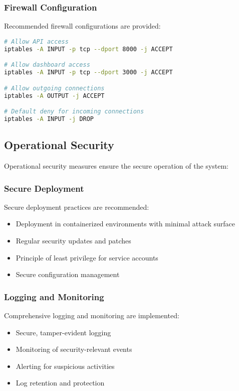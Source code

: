 \subsubsection{Firewall Configuration}
Recommended firewall configurations are provided:

\begin{lstlisting}[language=bash, caption=Firewall Configuration Example]
# Allow API access
iptables -A INPUT -p tcp --dport 8000 -j ACCEPT

# Allow dashboard access
iptables -A INPUT -p tcp --dport 3000 -j ACCEPT

# Allow outgoing connections
iptables -A OUTPUT -j ACCEPT

# Default deny for incoming connections
iptables -A INPUT -j DROP
\end{lstlisting}

\subsection{Operational Security}
Operational security measures ensure the secure operation of the system:

\subsubsection{Secure Deployment}
Secure deployment practices are recommended:

\begin{itemize}
    \item Deployment in containerized environments with minimal attack surface
    \item Regular security updates and patches
    \item Principle of least privilege for service accounts
    \item Secure configuration management
\end{itemize}

\subsubsection{Logging and Monitoring}
Comprehensive logging and monitoring are implemented:

\begin{itemize}
    \item Secure, tamper-evident logging
    \item Monitoring of security-relevant events
    \item Alerting for suspicious activities
    \item Log retention and protection
\end{itemize}


